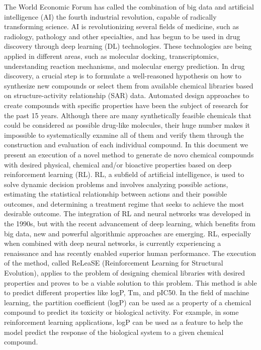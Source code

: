 \documentclass[conference]{IEEEtran}
\begin{document}
The World Economic Forum has called the combination of big data and artificial intelligence (AI) the fourth industrial revolution, capable of radically transforming science. AI is revolutionizing several fields of medicine, such as radiology, pathology and other specialties, and has begun to be used in drug discovery through deep learning (DL) technologies. 
These technologies are being applied in different areas, such as molecular docking, transcriptomics, understanding reaction mechanisms, and molecular energy prediction.
In drug discovery, a crucial step is to formulate a well-reasoned hypothesis on how to synthesize new compounds or select them from available chemical libraries based on structure-activity relationship (SAR) data. Automated design approaches to create compounds with specific properties have been the subject of research for the past 15 years. Although there are many synthetically feasible chemicals that could be considered as possible drug-like molecules, their huge number makes it impossible to systematically examine all of them and verify them through the construction and evaluation of each individual compound. 
In this document we present an execution of a novel method to generate de novo chemical compounds with desired physical, chemical and/or bioactive properties based on deep reinforcement learning (RL). 
RL, a subfield of artificial intelligence, is used to solve dynamic decision problems and involves analyzing possible actions, estimating the statistical relationship between actions and their possible outcomes, and determining a treatment regime that seeks to achieve the most desirable outcome. 
The integration of RL and neural networks was developed in the 1990s, but with the recent advancement of deep learning, which benefits from big data, new and powerful algorithmic approaches are emerging. RL, especially when combined with deep neural networks, is currently experiencing a renaissance and has recently enabled superior human performance. 
The execution of the method, called ReLeaSE (Reinforcement Learning for Structural Evolution), applies to the problem of designing chemical libraries with desired properties and proves to be a viable solution to this problem. This method is able to predict different properties like logP, Tm, and pIC50.
In the field of machine learning, the partition coefficient (logP) can be used as a property of a chemical compound to predict its toxicity or biological activity. For example, in some reinforcement learning applications, logP can be used as a feature to help the model predict the response of the biological system to a given chemical compound.
\end{document}
